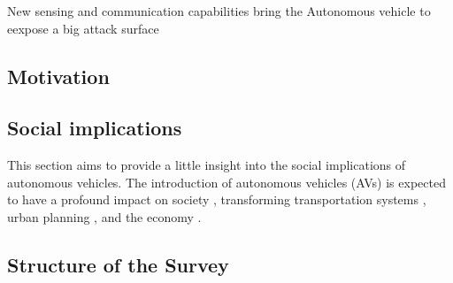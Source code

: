 New sensing and communication capabilities bring the Autonomous vehicle to eexpose a big attack surface  \cite{unknown2020connected}
\cite{cybersec}

\subsection{Motivation}\label{subsec:motivation}

\subsection{Social implications}\label{subsec:social-implications}

This section aims to provide a little insight into the social implications of autonomous vehicles.
The introduction of autonomous vehicles (AVs) is expected to have a profound impact on society \cite{thomas2020perception}, transforming transportation systems \cite{intelligent_transportation_2023}
, urban planning \cite{impact_autonomous_vehicles_2018}, and the economy \cite{economic_aspects_2020}.

\subsection{Structure of the Survey}\label{subsec:structure-of-the-survey}
